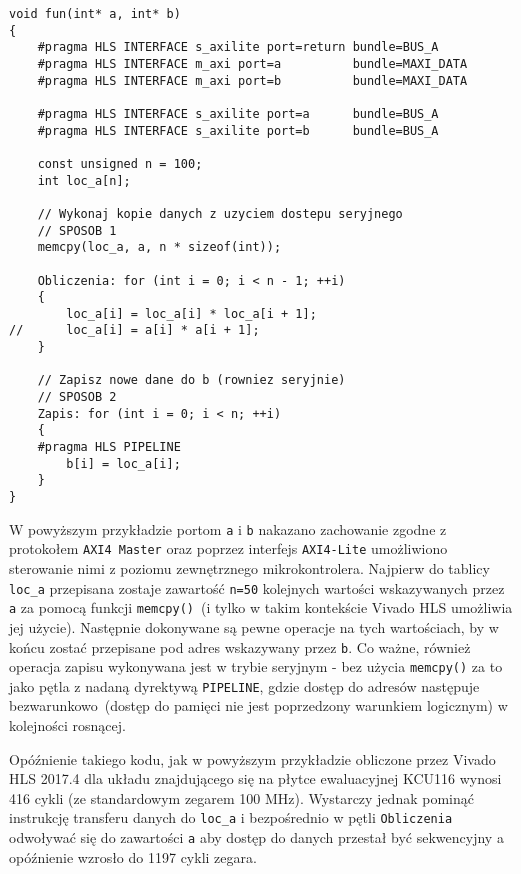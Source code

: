 \begin{itemize}
\begin{itemize}
\newpage

\begin{lstlisting}[caption=Przykład użycia interfejsu \texttt{AXI4 Master} z seryjnym dostępem do danych. Zmiana adresów wskazywanych umożliwiona została poprzez interfejs \texttt{AXI4-Lite}]
void fun(int* a, int* b)
{
	#pragma HLS INTERFACE s_axilite port=return bundle=BUS_A
	#pragma HLS INTERFACE m_axi port=a 		    bundle=MAXI_DATA
	#pragma HLS INTERFACE m_axi port=b 		    bundle=MAXI_DATA

	#pragma HLS INTERFACE s_axilite port=a 		bundle=BUS_A
	#pragma HLS INTERFACE s_axilite port=b 		bundle=BUS_A

	const unsigned n = 100;
	int loc_a[n];

	// Wykonaj kopie danych z uzyciem dostepu seryjnego
	// SPOSOB 1
	memcpy(loc_a, a, n * sizeof(int));

	Obliczenia: for (int i = 0; i < n - 1; ++i)
	{
		loc_a[i] = loc_a[i] * loc_a[i + 1];
//		loc_a[i] = a[i] * a[i + 1];
	}

	// Zapisz nowe dane do b (rowniez seryjnie)
	// SPOSOB 2
	Zapis: for (int i = 0; i < n; ++i)
	{
	#pragma HLS PIPELINE
		b[i] = loc_a[i];
	}
}
\end{lstlisting}
W powyższym przykładzie portom \texttt{a} i \texttt{b} nakazano zachowanie zgodne z protokołem \texttt{AXI4 Master} oraz poprzez interfejs \texttt{AXI4-Lite} umożliwiono sterowanie nimi z poziomu zewnętrznego mikrokontrolera. Najpierw do tablicy \texttt{loc\_a} przepisana zostaje zawartość \texttt{n=50} kolejnych wartości wskazywanych przez \texttt{a} za pomocą funkcji \texttt{memcpy()}~(i tylko w takim kontekście Vivado HLS umożliwia jej użycie). Następnie dokonywane są pewne operacje na tych wartościach, by w końcu zostać przepisane pod adres wskazywany przez \texttt{b}. Co ważne, również operacja zapisu wykonywana jest w trybie seryjnym - bez użycia \texttt{memcpy()} za to jako pętla z nadaną dyrektywą \texttt{PIPELINE}, gdzie dostęp do adresów następuje bezwarunkowo~(dostęp do pamięci nie jest poprzedzony warunkiem logicznym) w kolejności rosnącej.

Opóźnienie takiego kodu, jak w powyższym przykładzie obliczone przez Vivado HLS 2017.4 dla układu znajdującego się na płytce ewaluacyjnej KCU116 wynosi 416 cykli (ze standardowym zegarem 100 MHz). Wystarczy jednak pominąć instrukcję transferu danych do \texttt{loc\_a} i bezpośrednio w pętli \texttt{Obliczenia} odwoływać się do zawartości \texttt{a} aby dostęp do danych przestał być sekwencyjny a opóźnienie wzrosło do 1197 cykli zegara. 
\end{itemize}


\end{itemize}
